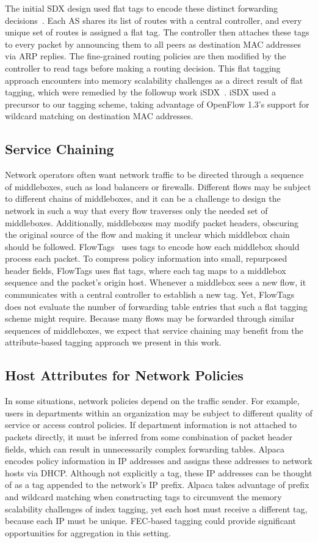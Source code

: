 The initial SDX design used flat tags to encode these distinct
forwarding decisions~\cite{sdx}. Each AS shares its list of routes with
a central controller, and every unique set of routes is assigned a flat
tag. The controller then attaches these tags to every packet by
announcing them to all peers as destination MAC addresses via ARP
replies. The fine-grained routing policies are then modified by the
controller to read tags before making a routing decision.  This flat
tagging approach encounters into memory scalability challenges as a
direct result of flat tagging, which were remedied by the followup work
iSDX~\cite{isdx}. iSDX used a precursor to our tagging scheme, taking
advantage of OpenFlow 1.3's support for wildcard matching on destination
MAC addresses.

\subsection{Service Chaining}
Network operators often want network traffic to be directed through a
sequence of middleboxes, such as load balancers or firewalls.  Different
flows may be subject to different chains of middleboxes, and it can be a
challenge to design the network in such a way that every flow traverses
only the needed set of middleboxes. Additionally, middleboxes may modify
packet headers, obscuring the original source of the flow and making it
unclear which middlebox chain should be followed.
FlowTags~\cite{flowtags} uses tags to encode how each middlebox should
process each packet. To compress policy information into small,
repurposed header fields, FlowTags uses flat tags, where each tag maps
to a middlebox sequence and the packet's origin host. Whenever a
middlebox sees a new flow, it communicates with a central controller to
establish a new tag.  Yet, FlowTags does not evaluate the number of
forwarding table entries that such a flat tagging scheme might
require. Because many flows may be forwarded through similar sequences
of middleboxes, we expect that service chaining may benefit from the
attribute-based tagging approach we present in this work.
 

\subsection{Host Attributes for Network Policies}
In some situations, network policies depend on the traffic sender.  For
example, users in departments within an organization may be subject
to different quality of service or access control policies. If
department information is not attached to packets directly, it must be
inferred from some combination of packet header fields, which can result
in unnecessarily complex forwarding tables.  Alpaca~\cite{alpaca}
encodes policy information in IP addresses and assigns these addresses
to network hosts via DHCP. Although not explicitly a tag, these IP
addresses can be thought of as a tag appended to the network's IP
prefix. Alpaca takes advantage of prefix and wildcard matching when
constructing tags to circumvent the memory scalability challenges of
index tagging, yet each host must receive a different tag, because each
IP must be unique. FEC-based tagging could provide significant
opportunities for aggregation in this setting.


